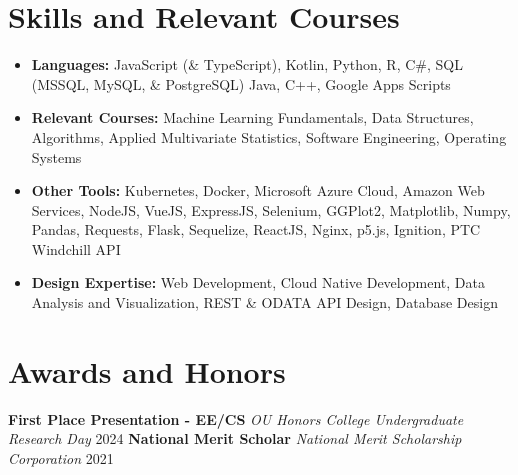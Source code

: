 \documentclass[a4paper,10pt]{extarticle}
\begin{document}
\section*{Skills and Relevant Courses}
\begin{itemize}
    \item \textbf{Languages:} JavaScript (\& TypeScript), Kotlin, Python, R, C\#, SQL (MSSQL, MySQL, \& PostgreSQL) Java, C++, Google Apps Scripts
    \item \textbf{Relevant Courses:} Machine Learning Fundamentals, Data Structures, Algorithms, Applied Multivariate Statistics, Software Engineering, Operating Systems
    \item \textbf{Other Tools:} Kubernetes, Docker, Microsoft Azure Cloud, Amazon Web Services, NodeJS, VueJS, ExpressJS,
    Selenium, GGPlot2, Matplotlib, Numpy, Pandas, Requests, Flask, Sequelize, ReactJS, Nginx, p5.js, Ignition, PTC Windchill API 
    \item \textbf{Design Expertise:} Web Development, Cloud Native Development, Data Analysis and Visualization, REST \& ODATA API Design, Database Design 
\end{itemize}

\section*{Awards and Honors}
\textbf{First Place Presentation - EE/CS} 
\textit{OU Honors College Undergraduate Research Day } \hfill 2024 %
  \textbf{National Merit Scholar} 
  \textit{National Merit Scholarship Corporation} \hfill 2021  \\%


\end{document}
